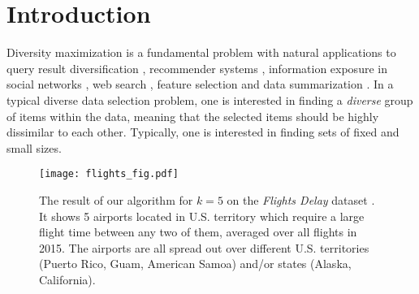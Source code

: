 \section{Introduction}
\label{sec:intro}
Diversity maximization is a fundamental problem
with natural applications to query result diversification \cite{drosou2012disc,deng2013complexity}, recommender systems \cite{castells2021novelty,kaminskas2016diversity, abbassi2013diversity}, information exposure in social networks \cite{matakos2020tell}, web search \cite{xin2006extracting, radlinski2006improving,divtopk,bhattacharya2011consideration}, feature selection \cite{zadeh2017scalable} and data summarization \cite{celis2018fair,mahabadi2023improved,CHANDRA2001438,zheng2017survey}.
In a typical diverse data selection problem, one is interested in finding a \emph{diverse} group of items within the data, meaning that the selected items should be highly dissimilar to each other.
Typically, one is interested in finding sets of fixed and small sizes.

\begin{figure}
\centering
\texttt{[image: flights\_fig.pdf]}

\caption{The result of our algorithm \algbacf{} for $k=5$ on the \emph{Flights Delay} dataset \cite{FlightsDelay}. It shows 5 airports located in U.S. territory which require a large flight time between any two of them, averaged over all flights in 2015. The airports are all spread out over different U.S. territories (Puerto Rico, Guam, American Samoa) and/or states (Alaska, California).
\label{fig:introflightex}}

\end{figure}

